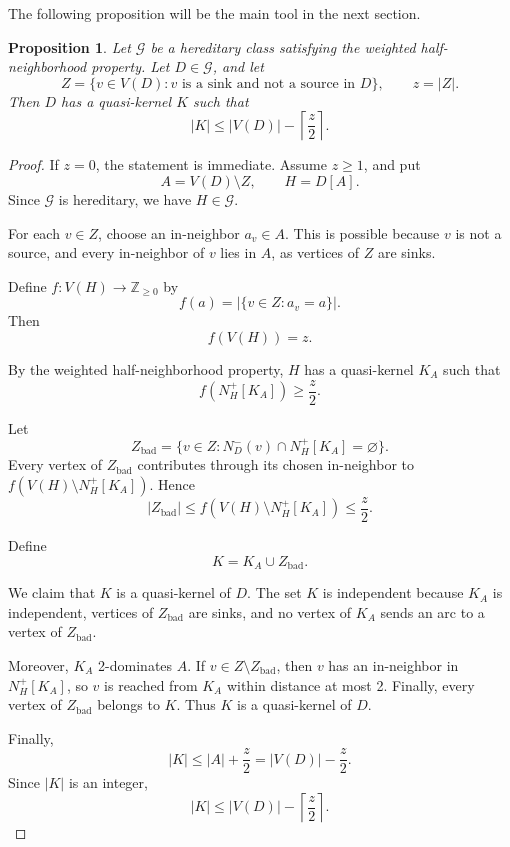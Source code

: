 \documentclass[11pt,a4paper]{article}
\newtheorem{proposition}[theorem]{Proposition}
\begin{document}
The following proposition will be the main tool in the next section.

\begin{proposition}\label{prop:sinks-general}
Let \(\mathcal G\) be a hereditary class satisfying the weighted
half-neighborhood property. Let \(D\in\mathcal G\), and let
\[
    Z=\{v\in V(D): v \text{ is a sink and not a source in }D\},
    \qquad z=|Z|.
\]
Then \(D\) has a quasi-kernel \(K\) such that
\[
    |K|\le |V(D)|-\left\lceil\frac z2\right\rceil .
\]
\end{proposition}

\begin{proof}
If \(z=0\), the statement is immediate. Assume \(z\ge1\), and put
\[
    A=V(D)\setminus Z,
    \qquad
    H=D[A].
\]
Since \(\mathcal G\) is hereditary, we have \(H\in\mathcal G\).

For each \(v\in Z\), choose an in-neighbor \(a_v\in A\). This is possible
because \(v\) is not a source, and every in-neighbor of \(v\) lies in \(A\),
as vertices of \(Z\) are sinks.

Define \(f:V(H)\to\mathbb Z_{\ge0}\) by
\[
    f(a)=|\{v\in Z:a_v=a\}|.
\]
Then
\[
    f(V(H))=z.
\]

By the weighted half-neighborhood property, \(H\) has a quasi-kernel
\(K_A\) such that
\[
    f(N_H^+[K_A])\ge \frac z2.
\]

Let
\[
    Z_{\mathrm{bad}}
    =
    \{v\in Z:N_D^-(v)\cap N_H^+[K_A]=\varnothing\}.
\]
Every vertex of \(Z_{\mathrm{bad}}\) contributes through its chosen
in-neighbor to \(f(V(H)\setminus N_H^+[K_A])\). Hence
\[
    |Z_{\mathrm{bad}}|
    \le
    f(V(H)\setminus N_H^+[K_A])
    \le
    \frac z2.
\]

Define
\[
    K=K_A\cup Z_{\mathrm{bad}}.
\]

We claim that \(K\) is a quasi-kernel of \(D\).
The set \(K\) is independent because \(K_A\) is independent,
vertices of \(Z_{\mathrm{bad}}\) are sinks,
and no vertex of \(K_A\) sends an arc to a vertex of
\(Z_{\mathrm{bad}}\).

Moreover, \(K_A\) 2-dominates \(A\).
If \(v\in Z\setminus Z_{\mathrm{bad}}\), then \(v\) has an in-neighbor in
\(N_H^+[K_A]\), so \(v\) is reached from \(K_A\) within distance at most 2.
Finally, every vertex of \(Z_{\mathrm{bad}}\) belongs to \(K\).
Thus \(K\) is a quasi-kernel of \(D\).

Finally,
\[
    |K|
    \le
    |A|+\frac z2
    =
    |V(D)|-\frac z2.
\]
Since \(|K|\) is an integer,
\[
    |K|
    \le
    |V(D)|-\left\lceil\frac z2\right\rceil .
\]
\end{proof}
\end{document}
